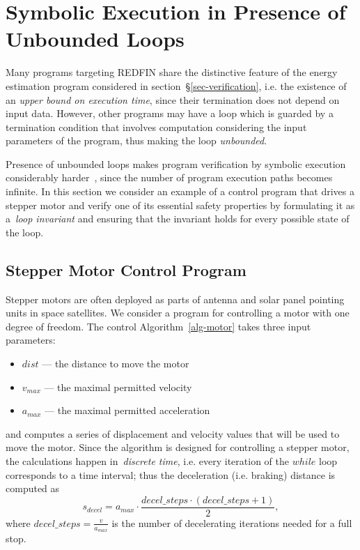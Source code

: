 \section{Symbolic Execution in Presence of Unbounded Loops\label{sec-motor-control}}

Many programs targeting REDFIN share the distinctive feature of
the energy estimation program considered in section~\S\ref{sec-verification},
i.e. the existence of an  \emph{upper bound on execution time},
since their termination does not depend on input data.
However, other programs may have a loop
which is guarded by a termination condition that involves computation
considering the input parameters of the program, thus making the loop
\emph{unbounded}.

Presence of unbounded loops makes program verification by symbolic execution considerably
harder~\cite[p.~50:20]{SurveySymExec-CSUR18}, since the number of program execution
paths becomes infinite. In this section we consider an example
of a control program that drives a stepper motor and verify one of its essential
safety properties by formulating it as a~\emph{loop invariant} and ensuring that the
invariant holds for every possible state of the loop.

\subsection{Stepper Motor Control Program}

Stepper motors are often deployed as parts of antenna and solar panel pointing units
in space satellites. We consider a program for controlling a motor with
one degree of freedom. The control Algorithm~\ref{alg-motor} takes three input
parameters:
\begin{itemize}
\item $dist$ --- the distance to move the motor
\item $v_{max}$ --- the maximal permitted velocity
\item $a_{max}$ --- the maximal permitted acceleration
\end{itemize}

\noindent
and computes a series of
displacement and velocity values that will be used to move the motor. Since the algorithm is
designed for controlling a stepper motor, the calculations happen in~\emph{discrete time},
i.e. every iteration of the $while$ loop corresponds to a time interval; thus
the deceleration (i.e. braking) distance is computed as
\[
s_{decel} = a_{max} \cdot \frac{decel\_steps \cdot (decel\_steps + 1)}{2},
\]
where $decel\_steps = \frac{v}{a_{max}}$ is the number of decelerating iterations
needed for a full stop.


